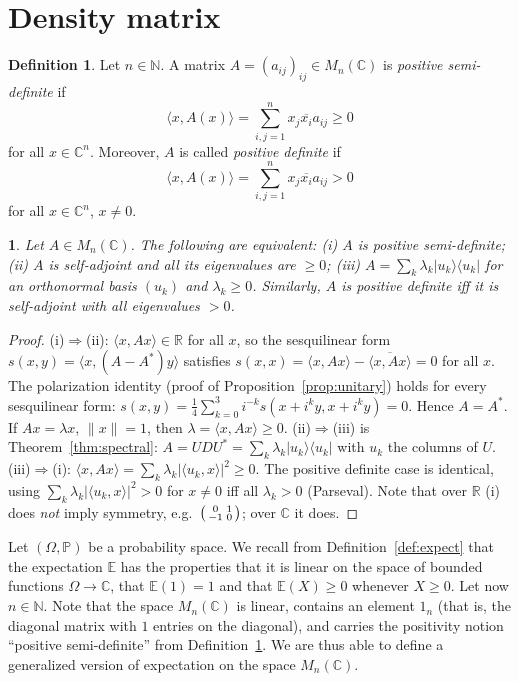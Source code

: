 \documentclass[11pt,a4paper]{article}
\numberwithin{equation}{section}
\newcommand{\N}{\mathbb{N}}
\newcommand{\R}{\mathbb{R}}
\newcommand{\C}{\mathbb{C}}
\newcommand{\PP}{\mathbb{P}}
\newcommand{\E}{\mathbb{E}}
\newcommand{\ip}[2]{\langle #1, #2\rangle}
\newcommand{\ketbra}[2]{|#1\rangle\langle #2|}
\newcommand{\conj}[1]{\overline{#1}}
\theoremstyle{plain}
\theoremstyle{definition}
\newtheorem{definition}[theorem]{Definition}
\newcommand{\thistheoremname}{}
\theoremstyle{plain}
\newtheorem*{addedthm*}{\thistheoremname}
\theoremstyle{definition}
\newenvironment{addedthm}[1]{\renewcommand{\thistheoremname}{#1}\begin{addedthm*}}{\end{addedthm*}}
\begin{document}
\section{Density matrix}

\begin{definition}\label{def:psd}
Let $n\in\N$. A matrix $A=(a_{ij})_{ij}\in M_n(\C)$ is \emph{positive semi-definite} if
\[
\ip{x}{A(x)}=\sum_{i,j=1}^nx_j\conj{x_i}a_{ij}\geqslant0
\]
for all $x\in\C^n$. Moreover, $A$ is called \emph{positive definite} if
\[
\ip{x}{A(x)}=\sum_{i,j=1}^nx_j\conj{x_i}a_{ij}>0
\]
for all $x\in\C^n$, $x\ne0$.
\end{definition}

\begin{addedthm}{Lemma 6.1a}
Let $A\in M_n(\C)$. The following are equivalent:
(i) $A$ is positive semi-definite;
(ii) $A$ is self-adjoint and all its eigenvalues are $\ge0$;
(iii) $A=\sum_k\lambda_k\ketbra{u_k}{u_k}$ for an orthonormal basis $(u_k)$ and $\lambda_k\ge0$.
Similarly, $A$ is positive definite iff it is self-adjoint with all eigenvalues $>0$.
\end{addedthm}
\begin{proof}
(i)$\Rightarrow$(ii): $\ip{x}{Ax}\in\R$ for all $x$, so the sesquilinear form
$s(x,y)=\ip{x}{(A-A^*)y}$ satisfies $s(x,x)=\ip{x}{Ax}-\conj{\ip{x}{Ax}}=0$ for all $x$.
The polarization identity (proof of Proposition~\ref{prop:unitary}) holds for every
sesquilinear form: $s(x,y)=\frac14\sum_{k=0}^3i^{-k}s(x+i^ky,x+i^ky)=0$. Hence $A=A^*$.
If $Ax=\lambda x$, $\|x\|=1$, then $\lambda=\ip{x}{Ax}\ge0$.
(ii)$\Rightarrow$(iii) is Theorem~\ref{thm:spectral}: $A=UDU^*=\sum_k\lambda_k\ketbra{u_k}{u_k}$
with $u_k$ the columns of $U$.
(iii)$\Rightarrow$(i): $\ip{x}{Ax}=\sum_k\lambda_k|\ip{u_k}{x}|^2\ge0$.
The positive definite case is identical, using $\sum_k\lambda_k|\ip{u_k}{x}|^2>0$ for
$x\ne0$ iff all $\lambda_k>0$ (Parseval). Note that over $\R$ (i) does \emph{not} imply
symmetry, e.g.\ $\begin{psmallmatrix}0&1\\-1&0\end{psmallmatrix}$; over $\C$ it does.
\end{proof}

Let $(\Omega,\PP)$ be a probability space. We recall from Definition~\ref{def:expect} that
the expectation $\E$ has the properties that it is linear on the space of bounded functions
$\Omega\to\C$, that $\E(1)=1$ and that $\E(X)\ge0$ whenever $X\ge0$. Let now $n\in\N$. Note
that the space $M_n(\C)$ is linear, contains an element $1_n$ (that is, the diagonal matrix
with $1$ entries on the diagonal), and carries the positivity notion ``positive
semi-definite'' from Definition~\ref{def:psd}. We are thus able to define a generalized
version of expectation on the space $M_n(\C)$.
\end{document}
